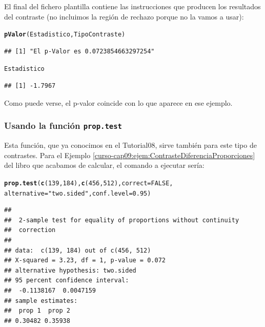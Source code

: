 \documentclass[10pt,a4paper]{article}\usepackage[]{graphicx}\usepackage[]{color}
\makeatletter
\newcommand{\hlnum}[1]{\textcolor[rgb]{0.686,0.059,0.569}{#1}}%
\newcommand{\hlstr}[1]{\textcolor[rgb]{0.192,0.494,0.8}{#1}}%
\newcommand{\hlstd}[1]{\textcolor[rgb]{0.345,0.345,0.345}{#1}}%
\newcommand{\hlkwc}[1]{\textcolor[rgb]{0.333,0.667,0.333}{#1}}%
\newcommand{\hlkwd}[1]{\textcolor[rgb]{0.737,0.353,0.396}{\textbf{#1}}}%
\newenvironment{kframe}{%
 \def\at@end@of@kframe{}%
 \ifinner\ifhmode%
  \def\at@end@of@kframe{\end{minipage}}%
  \begin{minipage}{\columnwidth}%
 \fi\fi%
 \def\FrameCommand##1{\hskip\@totalleftmargin \hskip-\fboxsep
 \colorbox{shadecolor}{##1}\hskip-\fboxsep
     \hskip-\linewidth \hskip-\@totalleftmargin \hskip\columnwidth}%
 \MakeFramed {\advance\hsize-\width
   \@totalleftmargin\z@ \linewidth\hsize
   \@setminipage}}%
 {\par\unskip\endMakeFramed%
 \at@end@of@kframe}
\newenvironment{knitrout}{}{} %
\newcounter {cont01}
\makeatother
\begin{document}
El final del fichero plantilla contiene las instrucciones que producen los resultados del contraste (no incluimos la región de rechazo porque no la vamos a usar):
\begin{knitrout}
\color{fgcolor}\begin{kframe}
\begin{alltt}
\hlkwd{pValor}\hlstd{(Estadistico,TipoContraste)}
\end{alltt}
\begin{verbatim}
## [1] "El p-Valor es 0.0723854663297254"
\end{verbatim}
\begin{alltt}
\hlstd{Estadistico}
\end{alltt}
\begin{verbatim}
## [1] -1.7967
\end{verbatim}
\end{kframe}
\end{knitrout}

Como puede verse, el p-valor coincide con lo que aparece en ese ejemplo.
\subsubsection*{Usando la función {\tt prop.test}}
\label{tut09:subsubsec:FuncionPropTest}

Esta función, que ya conocimos en el Tutorial08, sirve también para este tipo de contrastes. Para el Ejemplo \ref{curso-cap09:ejem:ContrasteDiferenciaProporciones} del libro que acabamos de calcular, el comando a ejecutar sería:

\begin{knitrout}
\color{fgcolor}\begin{kframe}
\begin{alltt}
\hlkwd{prop.test}\hlstd{(}\hlkwd{c}\hlstd{(}\hlnum{139}\hlstd{,} \hlnum{184}\hlstd{),} \hlkwd{c}\hlstd{(}\hlnum{456}\hlstd{,} \hlnum{512}\hlstd{),} \hlkwc{correct}\hlstd{=}\hlnum{FALSE}\hlstd{,}
    \hlkwc{alternative}\hlstd{=}\hlstr{"two.sided"}\hlstd{,} \hlkwc{conf.level}\hlstd{=}\hlnum{0.95}\hlstd{)}
\end{alltt}
\begin{verbatim}
## 
## 	2-sample test for equality of proportions without continuity
## 	correction
## 
## data:  c(139, 184) out of c(456, 512)
## X-squared = 3.23, df = 1, p-value = 0.072
## alternative hypothesis: two.sided
## 95 percent confidence interval:
##  -0.1138167  0.0047159
## sample estimates:
##  prop 1  prop 2 
## 0.30482 0.35938
\end{verbatim}
\end{kframe}
\end{knitrout}
\end{document}
